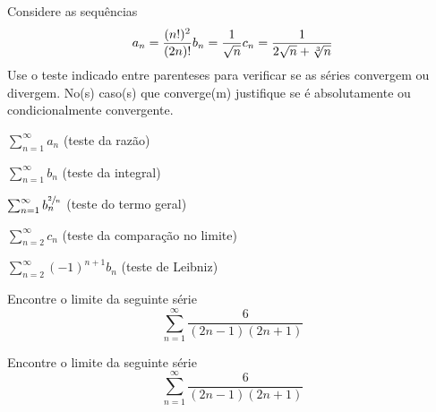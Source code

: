 \begin{exercises*}
\begin{exercise}
  Considere as sequências
  \[
    a_n = \frac{(n!)^2}{(2n)!} \hfill
    b_n = \frac{1}{\sqrt{n}}   \hfill
    c_n = \frac{1}{2\sqrt{n}+\sqrt[3]{n}} \hfill
  \]
  Use o teste indicado entre parenteses para verificar se as séries
  convergem ou divergem. No(s) caso(s) que converge(m) justifique se é
  absolutamente ou condicionalmente convergente.
  \begin{alphalist}
    \item \(\sum_{n=1}^\infty a_n\)                \tabto{25mm}(teste da razão)
    \item \(\sum_{n=1}^\infty b_n\)                \tabto{25mm}(teste da integral)
    \item \(\sum_{n=1}^\infty b_n^{\sfrac{2}{n}}\) \tabto{25mm}(teste do termo geral)
    \item \(\sum_{n=2}^\infty c_n\)                \tabto{25mm}(teste da comparação no limite)
    \item \(\sum_{n=2}^\infty (-1)^{n+1}b_n\)      \tabto{35mm}(teste de Leibniz)
  \end{alphalist}
\end{exercise}

\begin{exercise}
  Encontre o limite da seguinte série
  \[
    \sum_{n=1}^\infty\frac{6}{(2n-1)(2n+1)}
  \]
\end{exercise}

\begin{exercise}
  Encontre o limite da seguinte série
  \[
    \sum_{n=1}^\infty\frac{6}{(2n-1)(2n+1)}
  \]
\end{exercise}


\end{exercises*}
